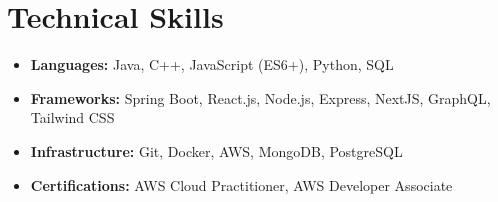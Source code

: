 \documentclass[a4paper,10pt]{article}
\begin{document}
\section{Technical Skills}
\begin{itemize}[leftmargin=0.15in, label={}]
    
    \item \textbf{Languages:} 
            Java,             C++,             JavaScript (ES6+),             Python,             SQL    
    \item \textbf{Frameworks:} 
            Spring Boot,             React.js,             Node.js,             Express,             NextJS,             GraphQL,             Tailwind CSS    
    \item \textbf{Infrastructure:} 
            Git,             Docker,             AWS,             MongoDB,             PostgreSQL    
    \item \textbf{Certifications:} 
            AWS Cloud Practitioner,             AWS Developer Associate    
\end{itemize}
\end{document}

